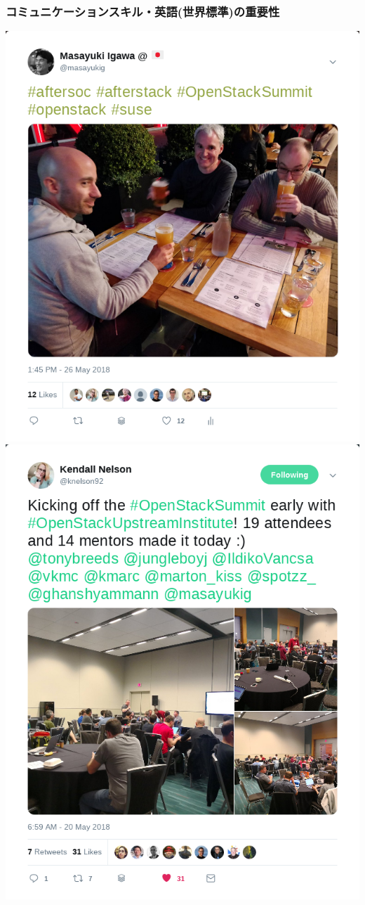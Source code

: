 \documentclass[aspectratio=169,11pt,hyperref={colorlinks=true}]{beamer}
\begin{document}
\begin{frame}
  \frametitle{コミュニケーションスキル・英語(世界標準)の重要性}
  \centering\includegraphics[scale=0.28]{tweet-suse.png}
  \centering\includegraphics[scale=0.28]{tweet-oui.png}
\end{frame}
\end{document}
